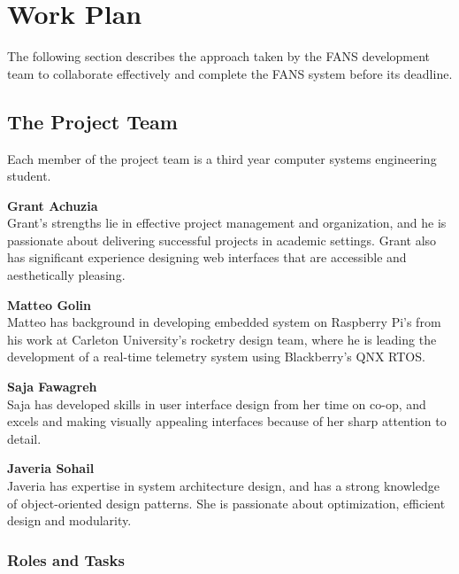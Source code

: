 \section{Work Plan}

The following section describes the approach taken by the FANS development team to collaborate effectively and complete
the FANS system before its deadline.

\subsection{The Project Team}

Each member of the project team is a third year computer systems engineering student.

\textbf{Grant Achuzia} \\
Grant's strengths lie in effective project management and organization, and he is passionate about delivering successful
projects in academic settings. Grant also has significant experience designing web interfaces that are accessible and
aesthetically pleasing.

\textbf{Matteo Golin} \\
Matteo has background in developing embedded system on Raspberry Pi's from his work at Carleton University's rocketry
design team, where he is leading the development of a real-time telemetry system using Blackberry's QNX RTOS.

\textbf{Saja Fawagreh} \\
Saja has developed skills in user interface design from her time on co-op, and excels and making visually appealing
interfaces because of her sharp attention to detail.

\textbf{Javeria Sohail} \\
Javeria has expertise in system architecture design, and has a strong knowledge of object-oriented design patterns. She
is passionate about optimization, efficient design and modularity.

\subsubsection{Roles and Tasks}

